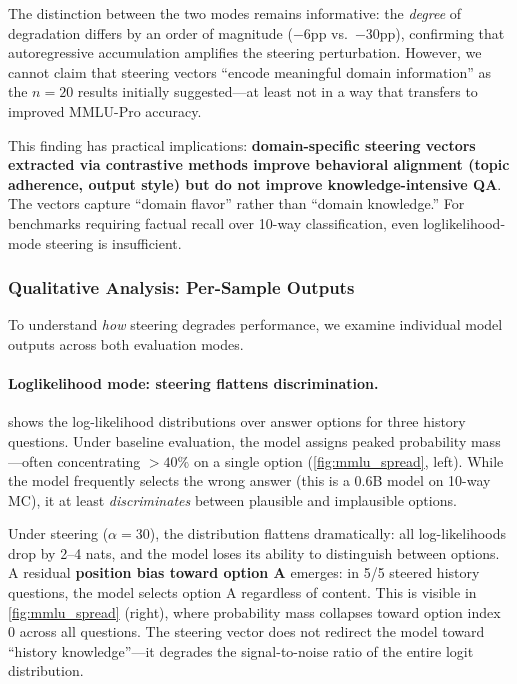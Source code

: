 \documentclass[11pt,a4paper]{article}
\begin{document}
The distinction between the two modes remains informative: the \textit{degree} of degradation differs by an order of magnitude ($-6$pp vs.\ $-30$pp), confirming that autoregressive accumulation amplifies the steering perturbation. However, we cannot claim that steering vectors ``encode meaningful domain information'' as the $n=20$ results initially suggested---at least not in a way that transfers to improved MMLU-Pro accuracy.

This finding has practical implications: \textbf{domain-specific steering vectors extracted via contrastive methods improve behavioral alignment (topic adherence, output style) but do not improve knowledge-intensive QA}. The vectors capture ``domain flavor'' rather than ``domain knowledge.'' For benchmarks requiring factual recall over 10-way classification, even loglikelihood-mode steering is insufficient.

\subsubsection{Qualitative Analysis: Per-Sample Outputs}

To understand \textit{how} steering degrades performance, we examine individual model outputs across both evaluation modes.

\paragraph{Loglikelihood mode: steering flattens discrimination.}
 shows the log-likelihood distributions over answer options for three history questions. Under baseline evaluation, the model assigns peaked probability mass---often concentrating $>40\%$ on a single option (\cref{fig:mmlu_spread}, left). While the model frequently selects the wrong answer (this is a 0.6B model on 10-way MC), it at least \textit{discriminates} between plausible and implausible options.

Under steering ($\alpha=30$), the distribution flattens dramatically: all log-likelihoods drop by 2--4 nats, and the model loses its ability to distinguish between options. A residual \textbf{position bias toward option A} emerges: in 5/5 steered history questions, the model selects option A regardless of content. This is visible in \cref{fig:mmlu_spread} (right), where probability mass collapses toward option index 0 across all questions. The steering vector does not redirect the model toward ``history knowledge''---it degrades the signal-to-noise ratio of the entire logit distribution.
\end{document}
